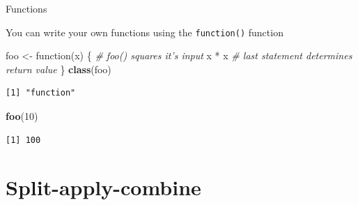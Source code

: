 \documentclass[10pt,ignorenonframetext,compress, aspectratio=169]{beamer}
\newenvironment{Shaded}{\begin{snugshade}}{\end{snugshade}}
\newcommand{\KeywordTok}[1]{\textcolor[rgb]{0.13,0.29,0.53}{\textbf{{#1}}}}
\newcommand{\DecValTok}[1]{\textcolor[rgb]{0.00,0.00,0.81}{{#1}}}
\newcommand{\StringTok}[1]{\textcolor[rgb]{0.31,0.60,0.02}{{#1}}}
\newcommand{\CommentTok}[1]{\textcolor[rgb]{0.56,0.35,0.01}{\textit{{#1}}}}
\newcommand{\NormalTok}[1]{{#1}}
\begin{document}
\begin{frame}[fragile]{Functions}

You can write your own functions using the \texttt{function()} function

\scriptsize

\begin{Shaded}
\begin{Highlighting}[]
\NormalTok{foo <-}\StringTok{ }\NormalTok{function(x) \{                    }\CommentTok{# foo() squares it's input}
    \NormalTok{x *}\StringTok{ }\NormalTok{x                               }\CommentTok{# last statement determines return value}
\NormalTok{\}}
\KeywordTok{class}\NormalTok{(foo)}
\end{Highlighting}
\end{Shaded}

\begin{verbatim}
[1] "function"
\end{verbatim}

\begin{Shaded}
\begin{Highlighting}[]
\KeywordTok{foo}\NormalTok{(}\DecValTok{10}\NormalTok{)}
\end{Highlighting}
\end{Shaded}

\begin{verbatim}
[1] 100
\end{verbatim}

\normalsize

\end{frame}

\section{Split-apply-combine}\label{split-apply-combine}
\end{document}
